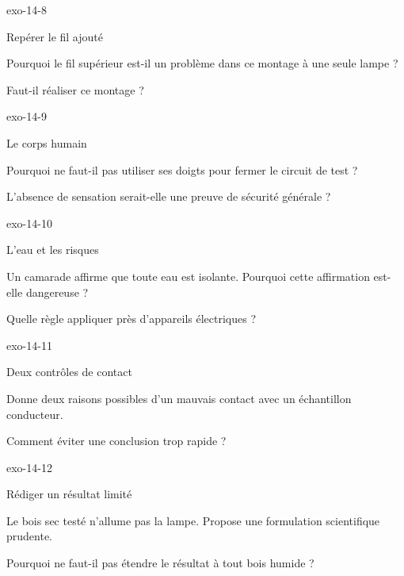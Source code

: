 \documentclass[12pt,twoside,openany]{book}
\begin{document}
\begin{blocLivre}{exo-14-8}
\begin{exercice}[2]{Repérer le fil ajouté}
\begin{questions}
\item Pourquoi le fil supérieur est-il un problème dans ce montage à une seule lampe ?
\item Faut-il réaliser ce montage ?
\end{questions}
\end{exercice}\end{blocLivre}
\begin{blocLivre}{exo-14-9}
\begin{exercice}[2]{Le corps humain}
\begin{questions}
\item Pourquoi ne faut-il pas utiliser ses doigts pour fermer le circuit de test ?
\item L’absence de sensation serait-elle une preuve de sécurité générale ?
\end{questions}
\end{exercice}\end{blocLivre}
\begin{blocLivre}{exo-14-10}
\begin{exercice}[2]{L’eau et les risques}
\begin{questions}
\item Un camarade affirme que toute eau est isolante. Pourquoi cette affirmation est-elle dangereuse ?
\item Quelle règle appliquer près d’appareils électriques ?
\end{questions}
\end{exercice}\end{blocLivre}
\begin{blocLivre}{exo-14-11}
\begin{exercice}[2]{Deux contrôles de contact}
\begin{questions}
\item Donne deux raisons possibles d’un mauvais contact avec un échantillon conducteur.
\item Comment éviter une conclusion trop rapide ?
\end{questions}
\end{exercice}\end{blocLivre}
\begin{blocLivre}{exo-14-12}
\begin{exercice}[3]{Rédiger un résultat limité}
\begin{questions}
\item Le bois sec testé n’allume pas la lampe. Propose une formulation scientifique prudente.
\item Pourquoi ne faut-il pas étendre le résultat à tout bois humide ?
\end{questions}
\end{exercice}\end{blocLivre}
\end{document}

